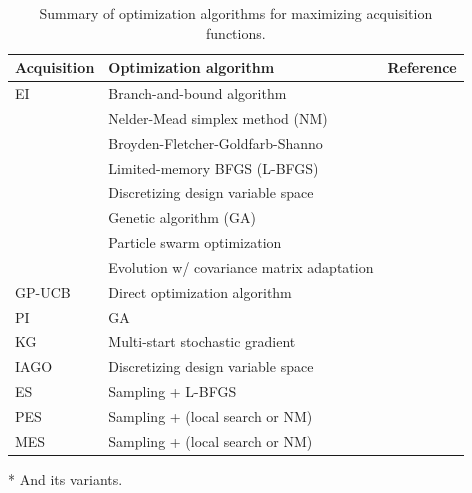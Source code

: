 \documentclass[journal ]{new-aiaa}
\begin{document}
\begin{table}[t]
  \centering
  \begin{threeparttable}
	\caption{Summary of optimization algorithms for maximizing acquisition functions.}
	\begin{tabularx}{\textwidth}{lXX}
      \toprule
      Acquisition & Optimization algorithm & Reference\\
      \midrule
      EI\tnote{*} & Branch-and-bound algorithm & \cite{Jones1998}\\
                  & Nelder-Mead simplex method (NM) & \cite{Huang2006smo,Huang2006jgo}\\
                  & Broyden-Fletcher-Goldfarb-Shanno & \cite{Sobester2005}\\
                  & Limited-memory BFGS (L-BFGS) & \cite{Frazier2018,Bonfiglio2018b}\\
                  & Discretizing design variable space & \cite{Ghoreishi2019,Grassi2023}\\
                  & Genetic algorithm (GA) & \cite{Forrester2007,Chen2016,ZhangY2018,Bailly2019,Do2022}\\
                  & Particle swarm optimization & \cite{Kontogiannis2020b,Ribeiro2023}\\
                  & Evolution w/ covariance matrix adaptation & \cite{Tran2020jcp,Tran2020cise}\\
      GP-UCB\tnote{*} & Direct optimization algorithm & \cite{Kandasamy2016,Kandasamy2017}\\
      PI\tnote{*} & GA & \cite{Ruan2020}\\
      KG & Multi-start stochastic gradient& \cite{WuJ2016}\\
      IAGO & Discretizing design variable space & \cite{Villemonteix2009}\\
      ES & Sampling + L-BFGS & \cite{Hennig2012}\\
      PES & Sampling + (local search or NM)& \cite{HernandezLobato2014}\\
      MES & Sampling + (local search or NM)& \cite{WangZ2017}\\
      \bottomrule
	\end{tabularx}
    \begin{tablenotes}
    \item[*] \small{And its variants.}
    \end{tablenotes}
  \label{Table5}
  \end{threeparttable}
\end{table}
\end{document}

